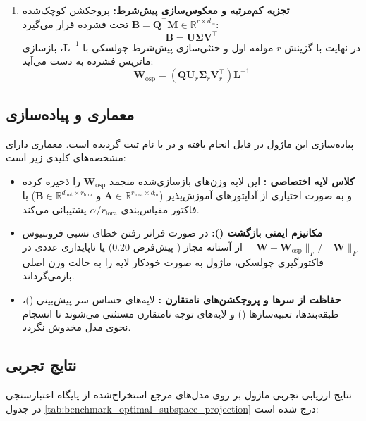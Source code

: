 \begin{enumerate}
    \item \textbf{تجزیه کم‌مرتبه و معکوس‌سازی پیش‌شرط:}
    پروجکشن کوچک‌شده $\mathbf{B} = \mathbf{Q}^\top \mathbf{M} \in \mathbb{R}^{r \times d_{\text{in}}}$ تحت  فشرده قرار می‌گیرد:
    \begin{equation}
    \mathbf{B} = \mathbf{U} \mathbf{\Sigma} \mathbf{V}^\top
    \end{equation}
    در نهایت با گزینش $r$ مولفه اول و خنثی‌سازی پیش‌شرط چولسکی با $\mathbf{L}^{-1}$، بازسازی ماتریس فشرده به دست می‌آید:
    \begin{equation}
    \mathbf{W}_{\text{osp}} = (\mathbf{Q} \mathbf{U}_r \mathbf{\Sigma}_r \mathbf{V}_r^\top) \mathbf{L}^{-1}
    \end{equation}
\end{enumerate}

\subsection{معماری و پیاده‌سازی}
پیاده‌سازی این ماژول در فایل  انجام یافته و در  با نام  ثبت گردیده است. معماری دارای مشخصه‌های کلیدی زیر است:
\begin{itemize}
    \item \textbf{کلاس لایه اختصاصی :} این لایه وزن‌های بازسازی‌شده منجمد $\mathbf{W}_{\text{osp}}$ را ذخیره کرده و به صورت اختیاری از آداپتورهای آموزش‌پذیر  ($\mathbf{A} \in \mathbb{R}^{r_{\text{lora}} \times d_{\text{in}}}$ و $\mathbf{B} \in \mathbb{R}^{d_{\text{out}} \times r_{\text{lora}}}$) با فاکتور مقیاس‌بندی $\alpha / r_{\text{lora}}$ پشتیبانی می‌کند.
    \item \textbf{مکانیزم ایمنی بازگشت ():} در صورت فراتر رفتن خطای نسبی فروبنیوس $\|\mathbf{W} - \mathbf{W}_{\text{osp}}\|_F / \|\mathbf{W}\|_F$ از آستانه مجاز ( پیش‌فرض $0.20$) یا ناپایداری عددی در فاکتورگیری چولسکی، ماژول به صورت خودکار لایه را به حالت وزن اصلی بازمی‌گرداند.
    \item \textbf{حفاظت از سرها و پروجکشن‌های نامتقارن :} لایه‌های حساس سر پیش‌بینی ()، طبقه‌بندها، تعبیه‌سازها () و لایه‌های توجه نامتقارن  مستثنی می‌شوند تا انسجام نحوی مدل مخدوش نگردد.
\end{itemize}

\subsection{نتایج تجربی}
نتایج ارزیابی تجربی ماژول  بر روی مدل‌های مرجع استخراج‌شده از پایگاه اعتبارسنجی  در جدول \ref{tab:benchmark_optimal_subspace_projection} درج شده است:

